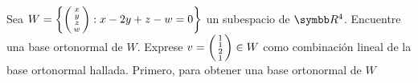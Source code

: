 \item Sea \(W = \fset{\fsmvec{x,y,z,w}: x - 2y + z - w  = 0}\) un subespacio de \(\realR^4\). Encuentre una base ortonormal de \(W\).
    Exprese \(v = \fsmvec{1,1,2,1} \in W\) como combinación lineal de la base ortonormal hallada.
    Primero, para obtener una base ortonormal de \(W\)

